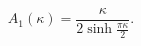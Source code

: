 \begin{equation}
A_{1}(\kappa)=\frac{\kappa}{2\sinh\frac{\pi\kappa}{2}}.
\label{A1}
\end{equation}

